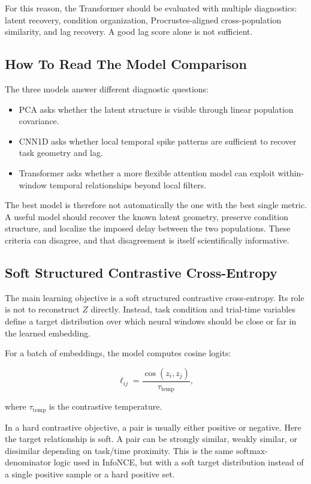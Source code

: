 \documentclass[11pt]{article}
\begin{document}
For this reason, the Transformer should be evaluated with multiple diagnostics:
latent recovery, condition organization, Procrustes-aligned cross-population
similarity, and lag recovery. A good lag score alone is not sufficient.

\subsection{How To Read The Model Comparison}

The three models answer different diagnostic questions:

\begin{itemize}
    \item PCA asks whether the latent structure is visible through linear
    population covariance.
    \item CNN1D asks whether local temporal spike patterns are sufficient to
    recover task geometry and lag.
    \item Transformer asks whether a more flexible attention model can exploit
    within-window temporal relationships beyond local filters.
\end{itemize}

The best model is therefore not automatically the one with the best single
metric. A useful model should recover the known latent geometry, preserve
condition structure, and localize the imposed delay between the two
populations. These criteria can disagree, and that disagreement is itself
scientifically informative.

\subsection{Soft Structured Contrastive Cross-Entropy}

The main learning objective is a soft structured contrastive cross-entropy.
Its role is not to reconstruct $Z$ directly. Instead, task condition and
trial-time variables define a target distribution over which neural windows
should be close or far in the learned embedding.

For a batch of embeddings, the model computes cosine logits:

\begin{equation}
\ell_{ij} =
\frac{\operatorname{cos}(z_i,z_j)}{\tau_{\text{temp}}},
\end{equation}

where $\tau_{\text{temp}}$ is the contrastive temperature.

In a hard contrastive objective, a pair is usually either positive or negative.
Here the target relationship is soft. A pair can be strongly similar, weakly
similar, or dissimilar depending on task/time proximity. This is the same
softmax-denominator logic used in InfoNCE, but with a soft target distribution
instead of a single positive sample or a hard positive set.
\end{document}
